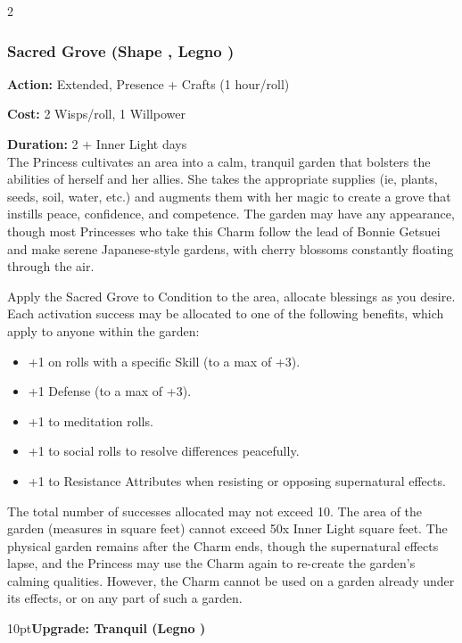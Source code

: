 \begin{multicols}{2}
\subsubsection*{Sacred Grove (Shape \textbullet\textbullet\textbullet\textbullet, Legno  \textbullet\textbullet\textbullet)}

\noindent \textbf{Action:} Extended, Presence + Crafts (1 hour/roll)

\noindent \textbf{Cost:} 2 Wisps/roll, 1 Willpower

\noindent \textbf{Duration:} 2 + Inner Light days \\

\noindent The Princess cultivates an area into a calm, tranquil garden that bolsters the abilities of herself and her allies. She takes the appropriate supplies (ie, plants, seeds, soil, water, etc.) and augments them with her magic to create a grove that instills peace, confidence, and competence. The garden may have any appearance, though most Princesses who take this Charm follow the lead of Bonnie Getsuei and make serene Japanese-style gardens, with cherry blossoms constantly floating through the air. 

Apply the Sacred Grove to Condition to the area, allocate blessings as you desire. Each activation success may be allocated to one of the following benefits, which apply to anyone within the garden:

  \begin{itemize} \item  +1 on rolls with a specific Skill (to a max of +3).
  \item  +1 Defense (to a max of +3).
  \item  +1 to meditation rolls.
  \item  +1 to social rolls to resolve differences peacefully.
  \item  +1 to Resistance Attributes when resisting or opposing supernatural effects. \end{itemize}

The total number of successes allocated may not exceed 10. The area of the garden (measures in square feet) cannot exceed 50x Inner Light square feet. The physical garden remains after the Charm ends, though the supernatural effects lapse, and the Princess may use the Charm again to re-create the garden's calming qualities. However, the Charm cannot be used on a garden already under its effects, or on any part of such a garden.

\begin{myindentpar}{10pt}\textbf{Upgrade: Tranquil (Legno \textbullet\textbullet\textbullet\textbullet\textbullet)}


\end{myindentpar}
\end{multicols}
